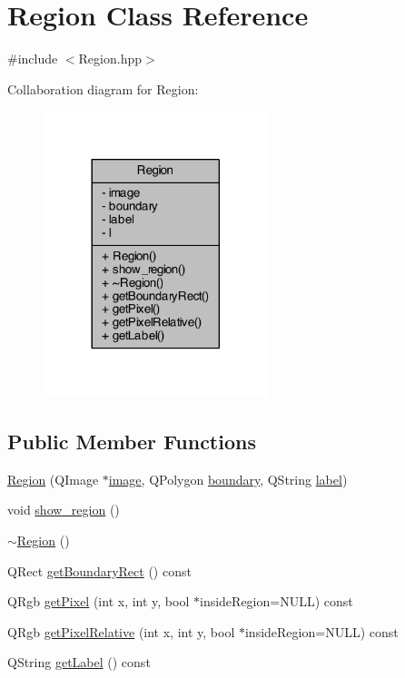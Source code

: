\hypertarget{class_region}{\section{Region Class Reference}
\label{class_region}
}


{\ttfamily \#include $<$Region.\+hpp$>$}



Collaboration diagram for Region\+:\nopagebreak
\begin{figure}[H]
\begin{center}
\leavevmode
\includegraphics[width=185pt]{class_region__coll__graph}
\end{center}
\end{figure}
\subsection*{Public Member Functions}
\begin{DoxyCompactItemize}
\item 
\hyperlink{class_region_a0e9c8974b3be20ce12a4b823f9f3f636}{Region} (Q\+Image $\ast$\hyperlink{class_region_a090b8bc9a8c73f8f874d8d439a0843be}{image}, Q\+Polygon \hyperlink{class_region_a4a59ef37013f3a6515a79317b0f0b4c0}{boundary}, Q\+String \hyperlink{class_region_afcc063386e02be883d71eaf5bcef2a55}{label})
\item 
void \hyperlink{class_region_ad2572028c1a4653a14dbfb1b622aa03e}{show\+\_\+region} ()
\item 
\hyperlink{class_region_a3c3670fff78f7511d156e3b2f0bc6266}{$\sim$\+Region} ()
\item 
Q\+Rect \hyperlink{class_region_a12c653b5aa89c899e2680c9dc1bbf46d}{get\+Boundary\+Rect} () const 
\item 
Q\+Rgb \hyperlink{class_region_acc0edaac14854ccc448f419844a722bf}{get\+Pixel} (int x, int y, bool $\ast$inside\+Region=N\+U\+L\+L) const 
\item 
Q\+Rgb \hyperlink{class_region_a421786f57555f6348ece3fa33eb86594}{get\+Pixel\+Relative} (int x, int y, bool $\ast$inside\+Region=N\+U\+L\+L) const 
\item 
Q\+String \hyperlink{class_region_a69d5acb5d1d81b50f225817217f60fdd}{get\+Label} () const 
\end{DoxyCompactItemize}
